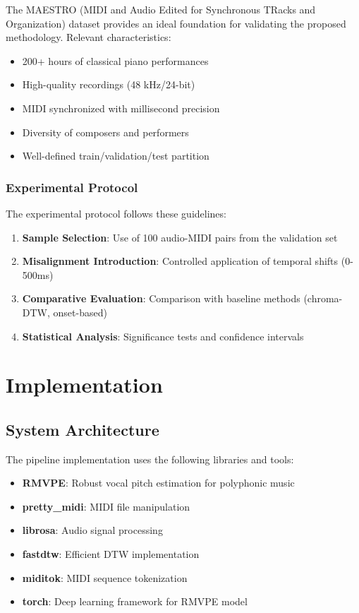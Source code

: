 \documentclass[12pt,a4paper]{article}
\begin{document}
The MAESTRO (MIDI and Audio Edited for Synchronous TRacks and Organization) dataset provides an ideal foundation for validating the proposed methodology. Relevant characteristics:

\begin{itemize}
    \item 200+ hours of classical piano performances
    \item High-quality recordings (48 kHz/24-bit)
    \item MIDI synchronized with millisecond precision
    \item Diversity of composers and performers
    \item Well-defined train/validation/test partition
\end{itemize}

\subsubsection{Experimental Protocol}

The experimental protocol follows these guidelines:

\begin{enumerate}
    \item \textbf{Sample Selection}: Use of 100 audio-MIDI pairs from the validation set
    \item \textbf{Misalignment Introduction}: Controlled application of temporal shifts (0-500ms)
    \item \textbf{Comparative Evaluation}: Comparison with baseline methods (chroma-DTW, onset-based)
    \item \textbf{Statistical Analysis}: Significance tests and confidence intervals
\end{enumerate}

\section{Implementation}
\label{sec:implementacao}

\subsection{System Architecture}

The pipeline implementation uses the following libraries and tools:

\begin{itemize}
    \item \textbf{RMVPE}: Robust vocal pitch estimation for polyphonic music
    \item \textbf{pretty\_midi}: MIDI file manipulation
    \item \textbf{librosa}: Audio signal processing
    \item \textbf{fastdtw}: Efficient DTW implementation
    \item \textbf{miditok}: MIDI sequence tokenization
    \item \textbf{torch}: Deep learning framework for RMVPE model
\end{itemize}
\end{document}
